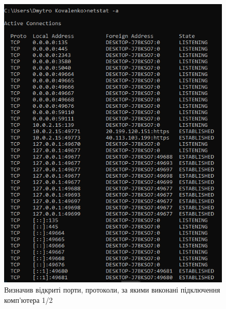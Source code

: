 \documentclass{article}
\begin{document}
\begin{normalsize}
\begin{figure}[H]
	\centering
	\includegraphics[width=\textwidth]{41}
	\caption{Визначив відкриті порти, протоколи, за якими виконані
		підключення комп'ютера 1/2}
\end{figure}


\end{normalsize}
\end{document}
